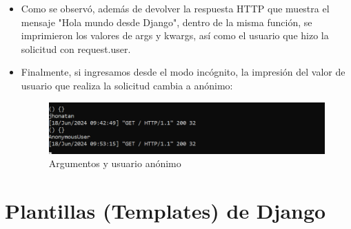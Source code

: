 \documentclass{article}
\begin{document}
\begin{itemize}
            \item Como se observó, además de devolver la respuesta HTTP que muestra el mensaje "Hola mundo desde Django", dentro de la misma función, se imprimieron los valores de args y kwargs, así como el usuario que hizo la solicitud con request.user.
            \item Finalmente, si ingresamos desde el modo incógnito, la impresión del valor de usuario que realiza la solicitud cambia a anónimo:

        \begin{figure}[H]
            \centering
            \includegraphics[width=0.8\linewidth]{img/Anonymous.png}
            \caption{Argumentos y usuario anónimo}
            \label{fig:enter-label}
        \end{figure}
        \end{itemize}
    \clearpage
    
    
    \section{Plantillas (Templates) de Django}
\end{document}
